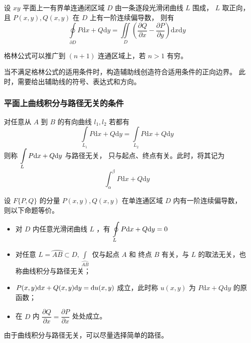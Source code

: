\begin{Theo}[格林公式]

    设 $ xy $ 平面上一有界单连通闭区域 $ D $ 由一条逐段光滑闭曲线 $ L $ 围成，
    $ L $ 取正向，且 $ P(x,y),Q(x,y) $ 在 $ D $ 上有一阶连续偏导数，
    则有
    $$
        \oint\limits_{\partial D} P\mathrm{d}x+Q\mathrm{d}y = \iint\limits_{D}
        \left(\dfrac{\partial Q}{\partial x}-\dfrac{\partial P}{\partial y}\right)
        \mathrm{d}x\mathrm{d}y
    $$ 
\end{Theo}

格林公式可以推广到 $ (n+1) $ 连通区域上，若 $ n > 1 $ 有穷。

当不满足格林公式的适用条件时，构造辅助线创造符合适用条件的正向边界。
此时，需要给出辅助线的符号、表达式和方向。

\subsubsection{平面上曲线积分与路径无关的条件}

\begin{Def}[与路径无关]

    对任意从 $ A $ 到 $ B $ 的有向曲线 $ l_1,l_2 $ 若都有$$
        \int\limits_{L_1}P\mathrm{d}x+Q\mathrm{d}y = 
        \int\limits_{L_2}P\mathrm{d}x+Q\mathrm{d}y
    $$ 则称 $ \displaystyle \int\limits_{L}P\mathrm{d}x+Q\mathrm{d}y $ 与路径无关，
    只与起点、终点有关。此时，将其记为
    $$
        \int_\alpha^\beta P\mathrm{d}x+Q\mathrm{d}y
    $$ 
\end{Def}

设 $ F\{P,Q\} $ 的分量 $ P(x,y),Q(x,y) $ 在单连通区域 $ D $ 内有一阶连续偏导数，
则以下命题等价。

\begin{itemize}
    \item 对 $ D $ 内任意光滑闭曲线 $ L $ ，有 $ \displaystyle \oint\limits_L P\mathrm{d}x+Q\mathrm{d}y = 0 $ 
    \item 对任意 $ L=\wideparen{AB}\subset D, \int\limits_{\wideparen{AB}} $ 仅与起点 $ A $ 和
    终点 $ B $ 有关，与 $ L $ 的取法无关，也称曲线积分与路径无关；
    \item $ \displaystyle P(x,y)\mathrm{d}x+Q(x,y)\mathrm{d}y = \mathrm{d}u(x,y) $ 成立，此时称
    $ u(x,y) $ 为 $ P\mathrm{d}x+Q\mathrm{d}y $ 的原函数；
    \item 在 $ D $ 内 $ \dfrac{\partial Q}{\partial x} = \dfrac{\partial P}{\partial x} $ 处处成立。
\end{itemize}

由于曲线积分与路径无关，可以尽量选择简单的路径。

